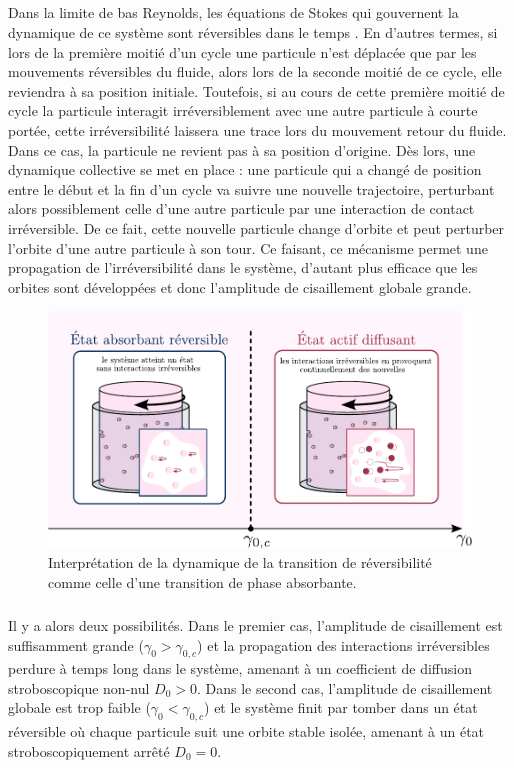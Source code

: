\subparagraph{}Dans la limite de bas Reynolds, les équations de Stokes qui gouvernent la dynamique de ce système sont réversibles dans le temps \cite{kimMicrohydrodynamicsPrinciplesSelected1991}. En d'autres termes, si lors de la première moitié d'un cycle une particule n'est déplacée que par les mouvements réversibles du fluide, alors lors de la seconde moitié de ce cycle, elle reviendra à sa position initiale. Toutefois, si au cours de cette première moitié de cycle la particule interagit irréversiblement avec une autre particule à courte portée, cette irréversibilité laissera une trace lors du mouvement retour du fluide. Dans ce cas, la particule ne revient pas à sa position d'origine. Dès lors, une dynamique collective se met en place : une particule qui a changé de position entre le début et la fin d'un cycle va suivre une nouvelle trajectoire, perturbant alors possiblement celle d'une autre particule par une interaction de contact irréversible. De ce fait, cette nouvelle particule change d'orbite et peut perturber l'orbite d'une autre particule à son tour. Ce faisant, ce mécanisme permet une propagation de l'irréversibilité dans le système, d'autant plus efficace que les orbites sont développées et donc l'amplitude de cisaillement globale grande.

\begin{figure}[h]
	\centering
	\includegraphics[width=\textwidth]{Chapitre1/Figures/InterpretationCDP/SuspensionsAPT.pdf}
	\caption{Interprétation de la dynamique de la transition de réversibilité comme celle d'une transition de phase absorbante.}
	\label{fig:SuspCDP}
\end{figure}

\subparagraph{}Il y a alors deux possibilités. Dans le premier cas, l'amplitude de cisaillement est suffisamment grande ($\gamma_0 > \gamma_{0,c}$) et la propagation des interactions irréversibles perdure à temps long dans le système, amenant à un coefficient de diffusion stroboscopique non-nul $D_0 >0$. Dans le second cas, l'amplitude de cisaillement globale est trop faible ($\gamma_0 < \gamma_{0,c}$) et le système finit par tomber dans un état réversible où chaque particule suit une orbite stable isolée, amenant à un état stroboscopiquement arrêté $D_0 = 0$.

